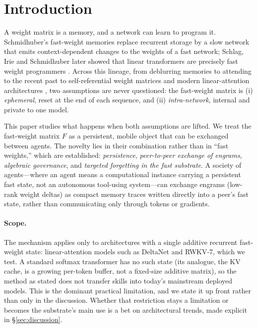 \documentclass[11pt]{article}
\theoremstyle{definition}
\newcommand{\F}{F}
\begin{document}
\begin{abstract}
\end{abstract}

\section{Introduction}

A weight matrix is a memory, and a network can learn to program it. Schmidhuber's fast-weight memories \cite{schmidhuber1992} replace recurrent storage by a slow network that emits context-dependent changes to the weights of a fast network; Schlag, Irie and Schmidhuber later showed that linear transformers are precisely fast weight programmers \cite{schlag2021}. Across this lineage, from deblurring memories \cite{hinton1987} to attending to the recent past \cite{ba2016} to self-referential weight matrices \cite{irie2022} and modern linear-attention architectures \cite{yang2024gdn}, two assumptions are never questioned: the fast-weight matrix is (i) \emph{ephemeral}, reset at the end of each sequence, and (ii) \emph{intra-network}, internal and private to one model.

This paper studies what happens when both assumptions are lifted. We treat the fast-weight matrix $\F$ as a persistent, mobile object that can be exchanged between agents. The novelty lies in their combination rather than in ``fast weights,'' which are established: \emph{persistence}, \emph{peer-to-peer exchange of engrams}, \emph{algebraic governance}, and \emph{targeted forgetting in the fast substrate}. A society of agents---where an agent means a computational instance carrying a persistent fast state, not an autonomous tool-using system---can exchange engrams (low-rank weight deltas) as compact memory traces written directly into a peer's fast state, rather than communicating only through tokens or gradients.

\paragraph{Scope.}
The mechanism applies only to architectures with a single additive recurrent fast-weight state: linear-attention models such as DeltaNet and RWKV-7, which we test. A standard softmax transformer has no such state (its analogue, the KV cache, is a growing per-token buffer, not a fixed-size additive matrix), so the method as stated does not transfer skills into today's mainstream deployed models. This is the dominant practical limitation, and we state it up front rather than only in the discussion. Whether that restriction stays a limitation or becomes the substrate's main use is a bet on architectural trends, made explicit in \S\ref{sec:discussion}.
\end{document}
